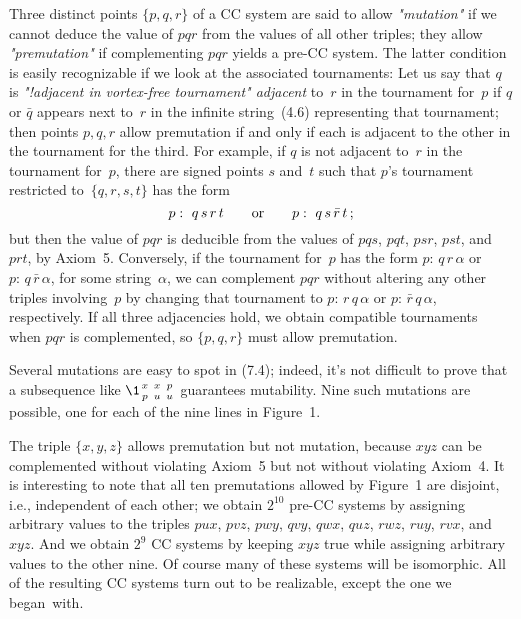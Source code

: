 \bigskip
Three distinct points $\{p,q,r\}$ of a CC system are said to allow
{\it "mutation"\/} if we cannot deduce the value of $pqr$ from the
values of all other triples; they allow {\it "pre\-mutation"} if complementing
$pqr$ yields a pre-CC system. The latter condition is easily recognizable if
we look at the associated tournaments: Let us say that $q$ is {\it
"!adjacent in vortex-free tournament"
adjacent\/} to~$r$ in the tournament for~$p$ if $q$ or $\bar q$ appears
next to~$r$ in the infinite string~(4.6) representing that tournament;
then points $p,q,r$ allow
premutation if and only if each is adjacent to the other in the tournament
for the third. For example, if $q$ is not adjacent to~$r$ in the
tournament for~$p$, there are signed points $s$ and~$t$ such that
$p$'s tournament restricted to~$\{q,r,s,t\}$ has the form
$$p:\ q\,s\,r\,t\qquad {\rm or}\qquad p:\ q\,s\,\bar r\,t\,;$$
but then the value of $pqr$ is deducible from the values of $pqs$,
$pqt$, $psr$, $pst$, and $prt$, by Axiom~5. Conversely, if the
tournament for~$p$ has the form $p:\,q\,r\,\alpha$ or
$p:\,q\,\bar r\,\alpha$, for some string~$\alpha$,
we can complement $pqr$ without altering
any other triples involving~$p$ by changing that tournament to
$p:\,r\,q\,\alpha$ or $p:\,\bar r\,q\,\alpha$, respectively. If
all three adjacencies hold, we obtain compatible tournaments when
$pqr$ is complemented, so $\{p,q,r\}$ must allow premutation.

Several mutations are easy to spot in (7.4); indeed, it's not difficult
to prove that a subsequence like
$\1{x\atop p}\,{x\atop u}\,{p\atop u}$ guarantees mutability. Nine such
mutations are possible, one for each of the nine lines in Figure~1.

The triple $\{x,y,z\}$ allows premutation but not mutation, because $xyz$ can
be complemented without violating Axiom~5 but not without violating
Axiom~4. It is interesting to note that all ten premutations allowed by
Figure~1 are disjoint, i.e., independent of each other; we obtain
$2^{10}$ pre-CC systems by assigning arbitrary values to the triples
$pux$, $pvz$, $pwy$, $qvy$, $qwx$, $quz$, $rwz$, $ruy$, $rvx$, and $xyz$. 
And we obtain $2^9$ CC systems
by keeping $xyz$ true while assigning arbitrary values to the other nine.
Of course many of these systems will be isomorphic.
All of the resulting CC systems turn out to be realizable, except the one
we began~with. 

